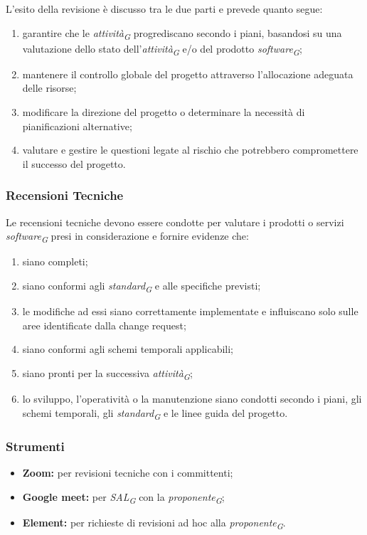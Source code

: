 L'esito della revisione è discusso tra le due parti e prevede quanto segue: 

\begin{enumerate}
    \item
        garantire che le \textit{attività}\textsubscript{\textit{G}} progrediscano secondo i piani, basandosi su una valutazione dello stato dell'\textit{attività}\textsubscript{\textit{G}} e/o del prodotto \textit{software}\textsubscript{\textit{G}}; 
    \item
        mantenere il controllo globale del progetto attraverso l'allocazione adeguata delle risorse; 
    \item
        modificare la direzione del progetto o determinare la necessità di pianificazioni alternative; 
    \item
        valutare e gestire le questioni legate al rischio che potrebbero compromettere il successo del progetto. 
\end{enumerate}

\subsubsection{Recensioni Tecniche}
Le recensioni tecniche devono essere condotte per valutare i prodotti o servizi \textit{software}\textsubscript{\textit{G}} presi in considerazione e fornire evidenze che: 

\begin{enumerate}
    \item
        siano completi; 
    \item
        siano conformi agli \textit{standard}\textsubscript{\textit{G}} e alle specifiche previsti; 
    \item
        le modifiche ad essi siano correttamente implementate e influiscano solo sulle aree identificate dalla change request; 
    \item
        siano conformi agli schemi temporali applicabili; 
    \item
        siano pronti per la successiva \textit{attività}\textsubscript{\textit{G}}; 
    \item
        lo sviluppo, l'operatività o la manutenzione siano condotti secondo i piani, gli schemi temporali, gli \textit{standard}\textsubscript{\textit{G}} e le linee guida del progetto. 
\end{enumerate}

\subsubsection{Strumenti}

\begin{itemize}
    \item \textbf{Zoom:} 
        per revisioni tecniche con i committenti; 
    \item \textbf{Google meet:} 
        per \textit{SAL}\textsubscript{\textit{G}} con la \textit{proponente}\textsubscript{\textit{G}}; 
    \item \textbf{Element:} 
        per richieste di revisioni ad hoc alla \textit{proponente}\textsubscript{\textit{G}}.
\end{itemize}
